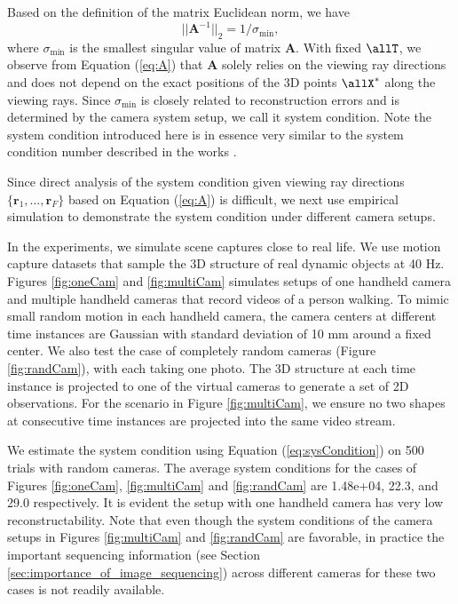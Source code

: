 Based on the definition of the matrix Euclidean norm, we have
\begin{equation}
||\mathbf{A}^{-1}||_2 = 1/\sigma_{\text{min}}, 
\label{eq:sysCondition}
\end{equation}
where $\sigma_{\text{min}}$ is the smallest singular value of matrix $\mathbf{A}$. 
With fixed $\allT$, we observe from Equation (\ref{eq:A}) that $\mathbf{A}$ solely relies on the viewing ray directions and does not depend on the exact positions of the 3D points $\allX^*$ along the viewing rays.
Since $\sigma_{\text{min}}$ is closely related to reconstruction errors and is determined by the camera system setup, we call it system condition. 
Note the system condition introduced here is in essence very similar to the system condition number described in the works \cite{Valmadre_CVPR2012,zheng2014joint}.

Since direct analysis of the system condition given viewing ray directions $\{\mathbf{r}_1,\dots,\mathbf{r}_F\}$ based on Equation (\ref{eq:A}) is difficult, we next use empirical simulation to demonstrate the system condition under different camera setups. %

In the experiments, we simulate scene captures close to real life.
We use motion capture datasets that sample the 3D structure of real dynamic objects at 40 Hz. 
Figures \ref{fig:oneCam} and \ref{fig:multiCam} simulates setups of one handheld camera and multiple handheld cameras that record videos of a person walking. 
To mimic small random motion in each handheld camera, 
the camera centers at different time instances are Gaussian with standard deviation of 10 mm around a fixed center. 
We also test the case of completely random cameras (Figure \ref{fig:randCam}), with each taking one photo. %
The 3D structure at each time instance is projected to one of the virtual cameras to generate a set of 2D observations. For the scenario in Figure \ref{fig:multiCam}, we ensure no two shapes at consecutive time instances are projected into the same video stream.

We estimate the system condition using Equation (\ref{eq:sysCondition}) on 500 trials with random cameras. 
The average system conditions for the cases of Figures \ref{fig:oneCam}, \ref{fig:multiCam} and \ref{fig:randCam} are 1.48e+04, 22.3, and 29.0 respectively. It is evident the setup with one handheld camera has very low reconstructability.
Note that even though the system conditions of the camera setups in Figures \ref{fig:multiCam} and \ref{fig:randCam} are favorable, in practice the important sequencing information (see Section \ref{sec:importance_of_image_sequencing}) across different cameras for these two cases is not readily available.

